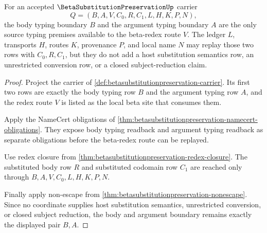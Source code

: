 \begin{theorem}
\label{thm:beta-substitution-preservation-body-argument-boundary}
For an accepted $\BetaSubstitutionPreservationUp$ carrier
$$
Q=(B,A,V,C_0,R,C_1,L,H,K,P,N),
$$
the body typing boundary $B$ and the argument typing boundary $A$ are the only source typing premises available to the beta-redex route $V$. The ledger $L$, transports $H$, routes $K$, provenance $P$, and local name $N$ may replay those two rows with $C_0,R,C_1$, but they do not add a host substitution semantics row, an unrestricted conversion row, or a closed subject-reduction claim.
\end{theorem}
\begin{proof}
Project the carrier of \autoref{def:betasubstitutionpreservation-carrier}. Its first two rows are exactly the body typing row $B$ and the argument typing row $A$, and the redex route $V$ is listed as the local beta site that consumes them.

Apply the NameCert obligations of \autoref{thm:betasubstitutionpreservation-namecert-obligations}. They expose body typing readback and argument typing readback as separate obligations before the beta-redex route can be replayed.

Use redex closure from \autoref{thm:betasubstitutionpreservation-redex-closure}. The substituted body row $R$ and substituted codomain row $C_1$ are reached only through $B,A,V,C_0,L,H,K,P,N$.

Finally apply non-escape from \autoref{thm:betasubstitutionpreservation-nonescape}. Since no coordinate supplies host substitution semantics, unrestricted conversion, or closed subject reduction, the body and argument boundary remains exactly the displayed pair $B,A$.
\end{proof}

